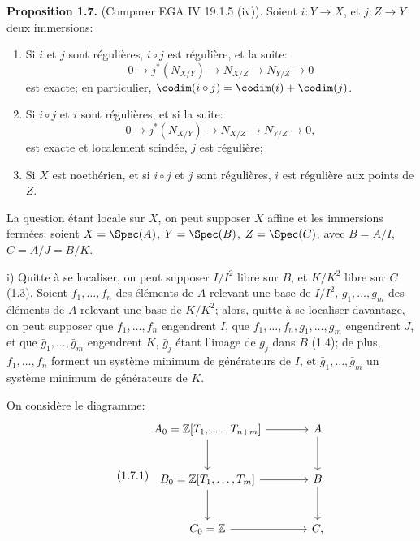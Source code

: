 \textbf{Proposition 1.7.} (Comparer EGA IV 19.1.5 (iv)). Soient $i:Y\longrightarrow X$, et $j:Z\longrightarrow Y$ deux immersions:
\begin{enumerate}[label=\roman*)]
\item Si $i$ et $j$ sont régulières, $i\circ j$ est régulière, et la suite:
\[
0\longrightarrow j^*(N_{X/Y})\longrightarrow N_{X/Z}\longrightarrow N_{Y/Z}\longrightarrow0
\]
est exacte; en particulier, $\codim(i\circ j)=\codim(i)+\codim(j)$.
\item Si $i\circ j$ et $i$ sont régulières, et si la suite:
\[
0\longrightarrow j^*(N_{X/Y})\longrightarrow N_{X/Z}\longrightarrow N_{Y/Z}\longrightarrow0,
\]
est exacte et localement scindée, $j$ est régulière;
\item Si $X$ est noethérien, et si $i\circ j$ et $j$ sont régulières, $i$ est régulière aux points de $Z$.
\end{enumerate}

La question étant locale sur $X$, on peut supposer $X$ affine et les immersions fermées; soient $X=\Spec(A)$, $Y=\Spec(B)$, $Z=\Spec(C)$, avec $B=A/I$, $C=A/J=B/K$.

i) Quitte à se localiser, on peut supposer $I/I^2$ libre sur $B$, et $K/K^2$ libre sur $C$ (1.3). Soient $f_1,\ldots,f_n$ des éléments de $A$ relevant une base de $I/I^2$, $g_1,\ldots,g_m$ des éléments de $A$ relevant une base de $K/K^2$; alors, quitte à se localiser davantage, on peut supposer que $f_1,\ldots,f_n$ engendrent $I$, que $f_1,\ldots,f_n,g_1,\ldots,g_m$ engendrent $J$, et que $\bar g_1,\ldots,\bar g_m$ engendrent $K$, $\bar g_j$ étant l'image de $g_j$ dans $B$ (1.4); de plus, $f_1,\ldots,f_n$ forment un système minimum de générateurs de $I$, et $\bar g_1,\ldots,\bar g_m$ un système minimum de générateurs de $K$.

On considère le diagramme:
\begin{equation}\tag{1.7.1}
\begin{tikzcd}[column sep=large,row sep=large]
A_0=\mathbb Z[T_1,\ldots,T_{n+m}] \arrow[r] \arrow[d] & A \arrow[d]\\
B_0=\mathbb Z[T_1,\ldots,T_m] \arrow[r] \arrow[d] & B \arrow[d]\\
C_0=\mathbb Z \arrow[r] & C,
\end{tikzcd}
\end{equation}
